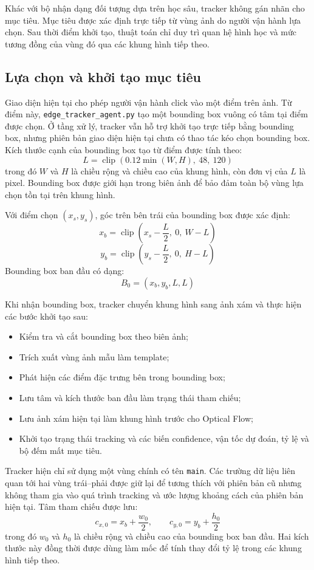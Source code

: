 \documentclass[../DoAn.tex]{subfiles}
\begin{document}
Khác với bộ nhận dạng đối tượng dựa trên học sâu, tracker không gán nhãn cho mục tiêu. Mục tiêu được xác định trực tiếp từ vùng ảnh do người vận hành lựa chọn. Sau thời điểm khởi tạo, thuật toán chỉ duy trì quan hệ hình học và mức tương đồng của vùng đó qua các khung hình tiếp theo.

\subsection{Lựa chọn và khởi tạo mục tiêu}

Giao diện hiện tại cho phép người vận hành click vào một điểm trên ảnh. Từ điểm này, \texttt{edge\_tracker\_agent.py} tạo một bounding box vuông có tâm tại điểm được chọn. Ở tầng xử lý, tracker vẫn hỗ trợ khởi tạo trực tiếp bằng bounding box, nhưng phiên bản giao diện hiện tại chưa có thao tác kéo chọn bounding box. Kích thước cạnh của bounding box tạo từ điểm được tính theo:
\[
L = \operatorname{clip}\left(0.12\min(W, H),\ 48,\ 120\right)
\]
trong đó $W$ và $H$ là chiều rộng và chiều cao của khung hình, còn đơn vị của $L$ là pixel. Bounding box được giới hạn trong biên ảnh để bảo đảm toàn bộ vùng lựa chọn tồn tại trên khung hình.

Với điểm chọn $(x_s, y_s)$, góc trên bên trái của bounding box được xác định:
\[
x_b = \operatorname{clip}\left(x_s - \frac{L}{2},\ 0,\ W-L\right)
\]
\[
y_b = \operatorname{clip}\left(y_s - \frac{L}{2},\ 0,\ H-L\right)
\]
Bounding box ban đầu có dạng:
\[
B_0 = (x_b, y_b, L, L)
\]

Khi nhận bounding box, tracker chuyển khung hình sang ảnh xám và thực hiện các bước khởi tạo sau:
\begin{itemize}
    \item Kiểm tra và cắt bounding box theo biên ảnh;
    \item Trích xuất vùng ảnh mẫu làm template;
    \item Phát hiện các điểm đặc trưng bên trong bounding box;
    \item Lưu tâm và kích thước ban đầu làm trạng thái tham chiếu;
    \item Lưu ảnh xám hiện tại làm khung hình trước cho Optical Flow;
    \item Khởi tạo trạng thái tracking và các biến confidence, vận tốc dự đoán, tỷ lệ và bộ đếm mất mục tiêu.
\end{itemize}

Tracker hiện chỉ sử dụng một vùng chính có tên \texttt{main}. Các trường dữ liệu liên quan tới hai vùng trái--phải được giữ lại để tương thích với phiên bản cũ nhưng không tham gia vào quá trình tracking và ước lượng khoảng cách của phiên bản hiện tại. Tâm tham chiếu được lưu:
\[
c_{x,0} = x_b + \frac{w_0}{2}, \qquad c_{y,0} = y_b + \frac{h_0}{2}
\]
trong đó $w_0$ và $h_0$ là chiều rộng và chiều cao của bounding box ban đầu. Hai kích thước này đồng thời được dùng làm mốc để tính thay đổi tỷ lệ trong các khung hình tiếp theo.
\end{document}
